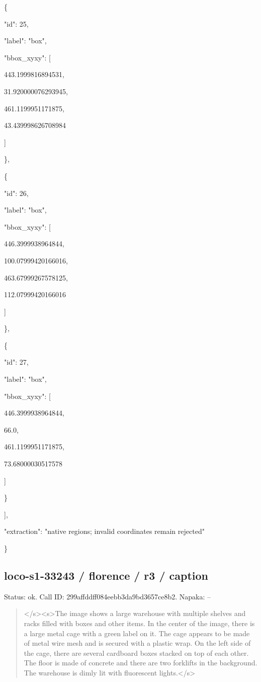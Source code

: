 \documentclass[10pt,a4paper]{article}
\begin{document}
    \{\par
      "id":\allowbreak{} 25,\allowbreak{}\par
      "label":\allowbreak{} "box",\allowbreak{}\par
      "bbox\_xyxy":\allowbreak{} [\par
        443.1999816894531,\allowbreak{}\par
        31.920000076293945,\allowbreak{}\par
        461.1199951171875,\allowbreak{}\par
        43.439998626708984\par
      ]\par
    \},\allowbreak{}\par
    \{\par
      "id":\allowbreak{} 26,\allowbreak{}\par
      "label":\allowbreak{} "box",\allowbreak{}\par
      "bbox\_xyxy":\allowbreak{} [\par
        446.3999938964844,\allowbreak{}\par
        100.07999420166016,\allowbreak{}\par
        463.67999267578125,\allowbreak{}\par
        112.07999420166016\par
      ]\par
    \},\allowbreak{}\par
    \{\par
      "id":\allowbreak{} 27,\allowbreak{}\par
      "label":\allowbreak{} "box",\allowbreak{}\par
      "bbox\_xyxy":\allowbreak{} [\par
        446.3999938964844,\allowbreak{}\par
        66.0,\allowbreak{}\par
        461.1199951171875,\allowbreak{}\par
        73.68000030517578\par
      ]\par
    \}\par
  ],\allowbreak{}\par
  "extraction":\allowbreak{} "native regions; invalid coordinates remain rejected"\par
\}
\subsection*{loco-s1-33243 / florence / r3 / caption}
Status: ok. Call ID: 299affddff084eebb3da9bd3657ce8b2. Napaka: --
\begin{quote}\footnotesize
</s>\allowbreak{}<s>\allowbreak{}The image shows a large warehouse with multiple shelves and racks filled with boxes and other items. In the center of the image,\allowbreak{} there is a large metal cage with a green label on it. The cage appears to be made of metal wire mesh and is secured with a plastic wrap. On the left side of the cage,\allowbreak{} there are several cardboard boxes stacked on top of each other. The floor is made of concrete and there are two forklifts in the background. The warehouse is dimly lit with fluorescent lights.</s>\allowbreak{}
\end{quote}
\end{document}
